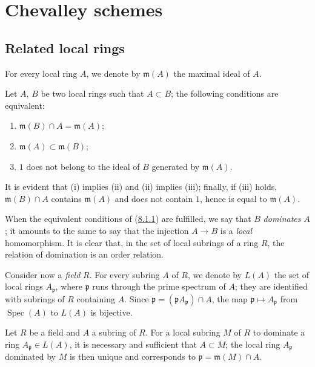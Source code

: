 \section{Chevalley schemes}
\label{section:I.8}

\subsection{Related local rings}
\label{subsection:I.8.1}

For every local ring $A$, we denote by $\mathfrak m(A)$ the maximal ideal of
$A$.

\begin{lemma}[8.1.1]
\label{I.8.1.1}
Let $A$, $B$ be two local rings such that $A\subset B$; the following
conditions are equivalent:
\begin{enumerate}
  \item[(i)] $\mathfrak m(B)\cap A=\mathfrak m(A)$;
  \item[(ii)] $\mathfrak m(A)\subset\mathfrak m(B)$;
  \item[(iii)] $1$ does not belong to the ideal of $B$ generated by
    $\mathfrak m(A)$.
\end{enumerate}
\end{lemma}

It is evident that (i) implies (ii) and (ii) implies (iii); finally, if (iii)
holds, $\mathfrak m(B)\cap A$ contains $\mathfrak m(A)$ and does not contain
$1$, hence is equal to $\mathfrak m(A)$.

When the equivalent conditions of
(\hyperref[I.8.1.1]{8.1.1}) are fulfilled, we say that $B$ \emph{dominates}
$A$; it amounts to the same to say that the injection $A\to B$ is a
\emph{local} homomorphism. It is clear that, in the set of local subrings of a
ring $R$, the relation of domination is an order relation.

\begin{env}[8.1.2]
\label{I.8.1.2}
Consider now a \emph{field} $R$. For every subring $A$ of $R$, we denote by
$L(A)$ the set of local rings $A_\mathfrak p$, where $\mathfrak p$ runs
through the prime spectrum of $A$; they are identified with subrings of $R$
containing $A$. Since
$\mathfrak p=(\mathfrak p A_\mathfrak p)\cap A$, the map
$\mathfrak p\mapsto A_\mathfrak p$ from $\operatorname{Spec}(A)$ to $L(A)$
is bijective.
\end{env}

\begin{lemma}[8.1.3]
\label{I.8.1.3}
Let $R$ be a field and $A$ a subring of $R$. For a local subring $M$ of $R$ to
dominate a ring $A_\mathfrak p\in L(A)$, it is necessary and sufficient that
$A\subset M$; the local ring $A_\mathfrak p$ dominated by $M$ is then unique
and corresponds to $\mathfrak p=\mathfrak m(M)\cap A$.
\end{lemma}

